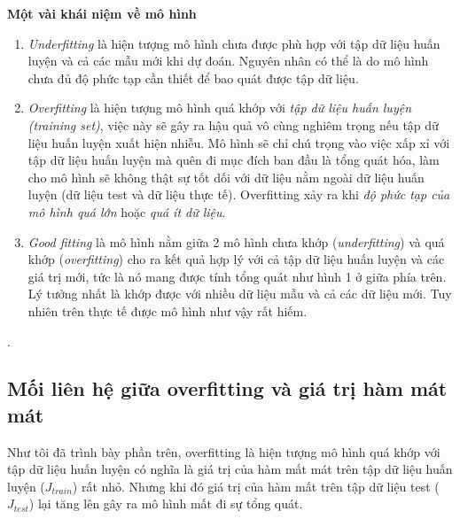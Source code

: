 \textbf{Một vài khái niệm về mô hình}
\begin{enumerate}
\item
\textit{Underfitting} là hiện tượng mô hình chưa được phù hợp với tập dữ liệu huấn luyện và cả các mẫu mới khi dự đoán. Nguyên nhân có thể là do mô hình chưa đủ độ phức tạp cần thiết để bao quát được tập dữ liệu.
\item   \textit{Overfitting} là hiện tượng mô hình quá khớp với \textit{tập dữ liệu huấn luyện (training set)}, việc này sẽ gây ra hậu quả vô cùng nghiêm trọng nếu tập dữ liệu huấn luyện xuất hiện nhiễu. Mô hình sẽ chỉ chú trọng vào việc xấp xỉ với tập dữ liệu huấn luyện mà quên đi mục đích ban đầu là tổng quát hóa, làm cho mô hình sẽ không thật sự tốt dối với dữ liệu nằm ngoài dữ liệu huấn luyện (dữ liệu test và dữ liệu thực tế). Overfitting xảy ra khi \textit{độ phức tạp của mô hình quá lớn} hoặc \textit{quá ít dữ liệu}.
\item \textit{Good fitting} là mô hình nằm giữa 2 mô hình chưa khớp (\textit{underfitting}) và quá khớp (\textit{overfitting}) cho ra kết quả hợp lý với cả tập dữ liệu huấn luyện và các giá trị mới, tức là nó mang được tính tổng quát như hình 1 ở giữa phía trên. Lý tưởng nhất là khớp được với nhiều dữ liệu mẫu và cả các dữ liệu mới. Tuy nhiên trên thực tế được mô hình như vậy rất hiếm.
\end{enumerate}.
\subsection{Mối liên hệ giữa overfitting và giá trị hàm mát mát}
Như tôi đã trình bày phần trên, overfitting là hiện tượng mô hình quá khớp với tập dữ liệu huấn luyện có nghĩa là giá trị của hàm mất mát trên tập dữ liệu huấn luyện (\textit{$J_{train}$}) rất nhỏ. Nhưng khi đó giá trị của hàm mất trên tập dữ liệu test (\textit{$J_{test}$}) lại tăng lên gây ra mô hình mất đi sự tổng quát. 

